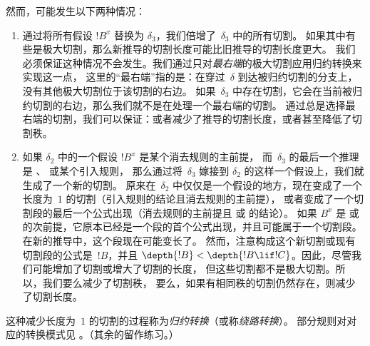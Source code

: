 \documentclass[../../../include/open-logic-section]{subfiles}
\begin{document}
然而，可能发生以下两种情况：
\begin{enumerate}
  \item 通过将所有假设 $!B^x$ 替换为 $\delta_3$，我们倍增了~$\delta_3$ 中的所有切割。
  如果其中有些是极大切割，那么新推导的切割长度可能比旧推导的切割长度更大。
  我们必须保证这种情况不会发生。我们通过只对\emph{最右端}的极大切割应用归约转换来实现这一点，
  这里的“最右端”指的是：在穿过~$\delta$ 到达被归约切割的分支上，没有其他极大切割位于该切割的右边。
  如果~$\delta_3$ 中存在切割，它会在当前被归约切割的右边，那么我们就不是在处理一个最右端的切割。
  通过总是选择最右端的切割，我们可以保证：或者减少了推导的切割长度，或者甚至降低了切割秩。
  \item 如果 $\delta_2$ 中的一个假设 $!B^x$ 是某个消去规则的主前提，
  而~$\delta_3$ 的最后一个推理是 \Elim{\lor}、\Elim{\lexists} 或某个引入规则，
  那么通过将~$\delta_3$ 嫁接到 $\delta_2$ 的这样一个假设上，我们就生成了一个新的切割。
  原来在~$\delta_2$ 中仅仅是一个假设的地方，现在变成了一个长度为~$1$ 的切割（引入规则的结论且消去规则的主前提），
  或者变成了一个切割段的最后一个公式出现（消去规则的主前提且 \Elim{\lor} 或 \Elim{\lexists} 的结论）。
  如果 $B^x$ 是 \Elim{\lor} 或 \Elim{\lexists} 的次前提，它原本已经是一个段的首个公式出现，并且可能属于一个切割段。
  在新的推导中，这个段现在可能变长了。
  然而，注意构成这个新切割或现有切割段的公式是~$!B$，并且
  $\depth{!B} < \depth{!B \lif !C}$。因此，尽管我们可能增加了切割或增大了切割的长度，
  但这些切割都不是极大切割。所以，我们要么减少了切割秩，
  要么，如果有相同秩的切割仍然存在，则减少了切割长度。
\end{enumerate}

这种减少长度为~$1$ 的切割的过程称为\emph{归约转换}（或称\emph{绕路转换}）。
部分规则对对应的转换模式见 。（其余的留作练习。）
\end{document}
